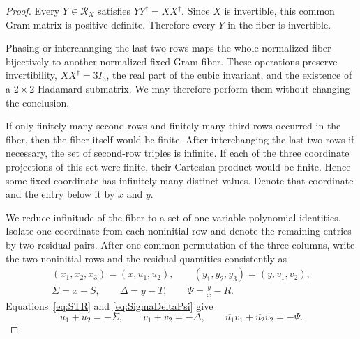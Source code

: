 \begin{proof}
{Every $Y\in\mathcal R_X$ satisfies $YY^{\dagger}=XX^{\dagger}$. Since $X$ is invertible, this common Gram matrix is positive definite. Therefore every $Y$ in the fiber is invertible.}

Phasing or interchanging the last two rows maps the whole normalized fiber bijectively to another normalized fixed-Gram fiber.  These operations preserve invertibility, $XX^{\dagger}=3I_3$, the real part of the cubic invariant, and the existence of a $2\times2$ Hadamard submatrix.  We may therefore perform them without changing the conclusion.

If only finitely many second rows and finitely many third rows occurred in the fiber, then the fiber itself would be finite.  After interchanging the last two rows if necessary, the set of second-row triples is infinite.  If each of the three coordinate projections of this set were finite, their Cartesian product would be finite.  Hence some fixed coordinate has infinitely many distinct values.  Denote that coordinate and the entry below it by $x$ and $y$.


We reduce infinitude of the fiber to a set of one-variable polynomial identities. Isolate one coordinate from each noninitial row and denote the remaining entries by two residual pairs. After one common permutation of the three columns, write the two noninitial rows and the residual quantities consistently as
\begin{equation}
\begin{gathered}
(x_1,x_2,x_3)=(x,u_1,u_2),\qquad
(y_1,y_2,y_3)=(y,v_1,v_2),\\
\Sigma=x-S,\qquad \Delta=y-T,\qquad
\Psi=\frac{y}{x}-R.
\end{gathered}
\label{eq:SigmaDeltaPsi}
\end{equation}
Equations~\eqref{eq:STR} and \eqref{eq:SigmaDeltaPsi} give
\begin{equation}
u_1+u_2=-\Sigma,
\qquad v_1+v_2=-\Delta,
\qquad
\overline{u_1}v_1+\overline{u_2}v_2=-\Psi.
\label{eq:residualsums}
\end{equation}


\end{proof}
